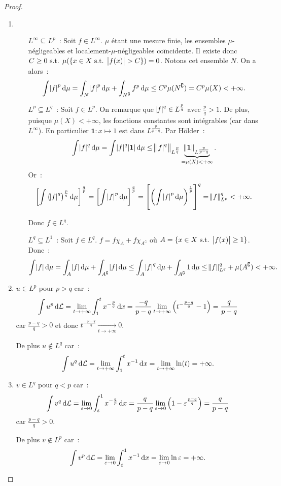 \documentclass{article}
\newcommand{\pinfty}{{+\infty}}
\newcommand{\st}{\text{ s.t. }}
\newcommand{\C}{\complement}
\begin{document}
\begin{proof}~
\begin{enumerate}
	\item~
	\begin{itemize}
		\item[$L^\infty \subseteq L^p$~:] Soit $f \in L^\infty$. $\mu$ étant une mesure finie, les ensembles $\mu$-négligeables et localement-$\mu$-négligeables coïncidente.
		Il existe donc $C \geq 0 \st \mu(\{x \in X \st \abs {f(x)} > C\}) = 0$. Notons cet ensemble $N$. On a alors~:
		\[\int \abs f^p\dif\mu = \int_N\abs f^p\dif\mu + \int_{N^\C}f^p\dif\mu \leq C^p\mu(N^\C) = C^p\mu(X) < \pinfty.\]

		\item[$L^p \subseteq L^q$~:] Soit $f \in L^p$. On remarque que $\abs f^q \in L^{\frac pq}$ avec $\frac pq > 1$. De plus, puisque $\mu(X) < \pinfty$, les fonctions constantes
		sont intégrables  (car dans $L^\infty$). En particulier $\mathbf 1 : x \mapsto 1$ est dans $L^{\frac p{p-q}}$. Par Hölder~:
		\[\int\abs f^q\dif\mu = \int\abs f^q\abs {\mathbf 1}\dif\mu \leq \norm {\abs f^q}_{L^{\frac pq}}\underbrace {\norm {\mathbf 1}_{L^{\frac p{p-q}}}}_{= \mu(X) < \pinfty}.\]
		Or~:
		\[\left[\int \left(\abs f^q\right)^{\frac pq}\dif\mu\right]^{\frac qp} = \left[\int \abs f^p\dif\mu\right]^{\frac qp} = \left[\left(\int \abs f^p\dif\mu\right)^{\frac 1p}\right]^q
		= \norm f_{L^p}^q < \pinfty.\]

		Donc $f \in L^q$.

		\item[$L^q \subseteq L^1$~:] Soit $f \in L^q$. $f = f\chi_A + f\chi_{A^\C}$ où $A = \{x \in X \st \abs {f(x)} \geq 1\}$. Donc~:
		\[\int \abs f\dif\mu = \int_A\abs f\dif\mu + \int_{A^\C}\abs f\dif\mu \leq \int_A\abs f^q\dif\mu + \int_{A^\C}1\dif\mu \leq \norm f_{L^q}^q + \mu(A^\C) < \pinfty.\]
	\end{itemize}

	\item $u \in L^p$ pour $p > q$ car~:
	\[\int u^p\dif\mathcal L = \lim_{t \to \pinfty}\int_1^tx^{-\frac pq}\dif x = \frac {-q}{p-q}\lim_{t \to \pinfty}\left(t^{-\frac {p-q}q} - 1\right) = \frac q{p-q}\]
	car $\frac {p-q}q > 0$ et donc $t^{-\frac {p-q}q} \xrightarrow[t \to \pinfty]{} 0$.

	De plus $u \not \in L^q$ car~:
	\[\int u^q\dif\mathcal L = \lim_{t \to \pinfty}\int_1^tx^{-1}\dif x = \lim_{t \to \pinfty}\ln(t) = \pinfty.\]

	\item $v \in L^q$ pour $q < p$ car~:
	\[\int v^q\dif\mathcal L = \lim_{\varepsilon \to 0}\int_\varepsilon^1x^{-\frac qp}\dif x = \frac q{p-q}\lim_{\varepsilon \to 0}\left(1 - \varepsilon^{\frac {p-q}q}\right)
	= \frac q{p-q}\]
	car $\frac {p-q}q > 0$.

	De plus $v \not \in L^p$ car~:
	\[\int v^p\dif\mathcal L = \lim_{\varepsilon \to 0}\int_\varepsilon^1x^{-1}\dif x = \lim_{\varepsilon \to 0}\ln\varepsilon = \pinfty.\]
\end{enumerate}
\end{proof}
\end{document}
